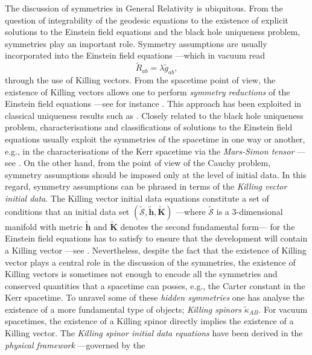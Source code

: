 \documentclass[10pt,a4paper]{article}
\theoremstyle{plain}
\def\bmh{{\bm h}}
\def\bmK{{\bm K}}
\begin{document}
   
The discussion of symmetries  in General
Relativity is ubiquitous. From the question of integrability of the geodesic
equations to the existence of explicit solutions to the Einstein field
equations and the black hole uniqueness problem, symmetries play an important role.   
Symmetry assumptions are usually incorporated into
 the Einstein field equations ---which in vacuum read
\begin{equation}
\tilde{R}_{ab}=\lambda \tilde{g}_{ab},
\label{EFEVacuum}
\end{equation} 
 through the use of Killing vectors.  From the spacetime point of
 view, the existence of Killing vectors allows one to perform
 \emph{symmetry reductions} of the Einstein field equations ---see for
 instance \cite{Wei90a}. This approach has been exploited in classical
 uniqueness results such as \cite{Rob75b}.  Closely related to the
 black hole uniqueness problem, characterisations and classifications
 of solutions to the Einstein field equations usually exploit the
 symmetries of the spacetime in one way or another, e.g., in the
 characterisations of the Kerr spacetime via the \emph{Mars-Simon
 tensor} ---see \cite{Mar99,Mar00,Sim84}.  On the other hand, from the
 point of view of the Cauchy problem, symmetry assumptions should be
 imposed only at the level of initial data. In this regard, symmetry
 assumptions can be phrased in terms of the \emph{Killing vector
 initial data}.  The Killing vector initial data equations constitute
 a set of conditions that an initial data set
 $(\tilde{\mathcal{S}},\tilde{\bmh},\tilde{\bmK})$ ---where
 $\tilde{\mathcal{S}}$ is a 3-dimensional manifold with metric
 $\tilde{\bmh}$ and $\tilde{\bmK}$ denotes the second fundamental
 form--- for the Einstein field equations has to satisfy to ensure
 that the development will contain a Killing vector ---see
 \cite{BeiChr97b}.  Nevertheless, despite the fact that the existence
 of Killing vector plays a central role in the discussion of the
 symmetries, the existence of Killing vectors is sometimes not enough
 to encode all the symmetries and conserved quantities that a
 spacetime can posses, e.g., the Carter constant in the Kerr
 spacetime. To unravel some of these \emph{hidden symmetries} one has
 analyse the existence of a more fundamental type of objects;
 \emph{Killing spinors} $\tilde{\kappa}_{AB}$. For vacuum spacetimes,
 the existence of a Killing spinor directly implies the existence of a
 Killing vector. The \emph{Killing spinor initial data equations} have
 been derived in the \emph{physical framework} ---governed by the
\end{document}
